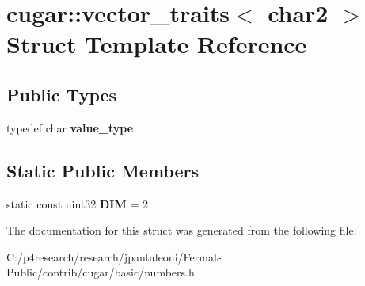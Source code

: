\hypertarget{structcugar_1_1vector__traits_3_01char2_01_4}{}\section{cugar\+:\+:vector\+\_\+traits$<$ char2 $>$ Struct Template Reference}
\label{structcugar_1_1vector__traits_3_01char2_01_4}
\subsection*{Public Types}
\begin{DoxyCompactItemize}
\item 
\mbox{\label{structcugar_1_1vector__traits_3_01char2_01_4_ae69fc4b82166820c3c491e424a2c91c5}} 
typedef char {\bfseries value\+\_\+type}
\end{DoxyCompactItemize}
\subsection*{Static Public Members}
\begin{DoxyCompactItemize}
\item 
\mbox{\label{structcugar_1_1vector__traits_3_01char2_01_4_a50886ddbcbd2546c6922d91941f52f9c}} 
static const uint32 {\bfseries D\+IM} = 2
\end{DoxyCompactItemize}


The documentation for this struct was generated from the following file\+:\begin{DoxyCompactItemize}
\item 
C\+:/p4research/research/jpantaleoni/\+Fermat-\/\+Public/contrib/cugar/basic/numbers.\+h\end{DoxyCompactItemize}

